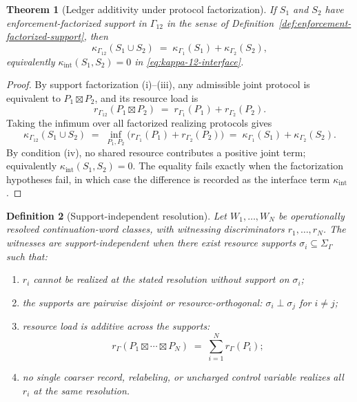 \documentclass[11pt]{article}
\newtheorem{theorem}{Theorem}[section]
\newtheorem{definition}[theorem]{Definition}
\begin{document}
\begin{theorem}[Ledger additivity under protocol factorization]\label{thm:ledger-additivity-protocol-factorization}
If $S_1$ and $S_2$ have enforcement-factorized support in $\Gamma_{12}$
in the sense of Definition~\ref{def:enforcement-factorized-support},
then
\[
    \kappa_{\Gamma_{12}}(S_1\cup S_2)
    \;=\;
    \kappa_{\Gamma_1}(S_1)+\kappa_{\Gamma_2}(S_2),
\]
equivalently $\kappa_{\mathrm{int}}(S_1,S_2)=0$ in
\eqref{eq:kappa-12-interface}.
\end{theorem}
\begin{proof}
By support factorization (i)--(iii), any admissible joint protocol is
equivalent to $P_1\boxtimes P_2$, and its resource load is
\[
    r_{\Gamma_{12}}(P_1\boxtimes P_2)
    \;=\;
    r_{\Gamma_1}(P_1)+r_{\Gamma_2}(P_2).
\]
Taking the infimum over all factorized realizing protocols gives
\[
    \kappa_{\Gamma_{12}}(S_1\cup S_2)
    \;=\;
    \inf_{P_1,P_2}\bigl(r_{\Gamma_1}(P_1)+r_{\Gamma_2}(P_2)\bigr)
    \;=\;
    \kappa_{\Gamma_1}(S_1)+\kappa_{\Gamma_2}(S_2).
\]
By condition (iv), no shared resource contributes a positive joint
term; equivalently $\kappa_{\mathrm{int}}(S_1,S_2)=0$.  The equality
fails exactly when the factorization hypotheses fail, in which case
the difference is recorded as the interface term $\kappa_{\mathrm{int}}$.
\end{proof}

\begin{definition}[Support-independent resolution]\label{def:support-independent-resolution}
Let $W_1,\ldots,W_N$ be operationally resolved continuation-word
classes, with witnessing discriminators $r_1,\ldots,r_N$.  The
witnesses are \emph{support-independent} when there exist resource
supports $\sigma_i\subseteq\Sigma_\Gamma$ such that:
\begin{enumerate}[label=(\roman*),leftmargin=2em]
\item $r_i$ cannot be realized at the stated resolution without support
on $\sigma_i$;
\item the supports are pairwise disjoint or resource-orthogonal:
$\sigma_i\perp\sigma_j$ for $i\ne j$;
\item resource load is additive across the supports:
\[
    r_\Gamma(P_1\boxtimes\cdots\boxtimes P_N)
    \;=\;
    \sum_{i=1}^N r_\Gamma(P_i);
\]
\item no single coarser record, relabeling, or uncharged control
variable realizes all $r_i$ at the same resolution.
\end{enumerate}
\end{definition}
\end{document}
